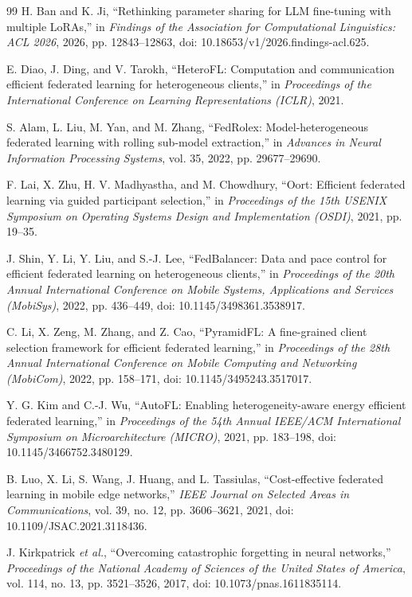 \documentclass[10pt,conference,letterpaper]{IEEEtran}
\begin{document}
\begin{thebibliography}{99}
H. Ban and K. Ji,
``Rethinking parameter sharing for LLM fine-tuning with multiple LoRAs,''
in \emph{Findings of the Association for Computational Linguistics: ACL 2026}, 2026, pp. 12843--12863,
doi: 10.18653/v1/2026.findings-acl.625.

E. Diao, J. Ding, and V. Tarokh,
``HeteroFL: Computation and communication efficient federated learning for heterogeneous clients,''
in \emph{Proceedings of the International Conference on Learning Representations (ICLR)}, 2021.

S. Alam, L. Liu, M. Yan, and M. Zhang,
``FedRolex: Model-heterogeneous federated learning with rolling sub-model extraction,''
in \emph{Advances in Neural Information Processing Systems}, vol. 35, 2022, pp. 29677--29690.

F. Lai, X. Zhu, H. V. Madhyastha, and M. Chowdhury,
``Oort: Efficient federated learning via guided participant selection,''
in \emph{Proceedings of the 15th USENIX Symposium on Operating Systems Design and Implementation (OSDI)}, 2021, pp. 19--35.

J. Shin, Y. Li, Y. Liu, and S.-J. Lee,
``FedBalancer: Data and pace control for efficient federated learning on heterogeneous clients,''
in \emph{Proceedings of the 20th Annual International Conference on Mobile Systems, Applications and Services (MobiSys)}, 2022, pp. 436--449,
doi: 10.1145/3498361.3538917.

C. Li, X. Zeng, M. Zhang, and Z. Cao,
``PyramidFL: A fine-grained client selection framework for efficient federated learning,''
in \emph{Proceedings of the 28th Annual International Conference on Mobile Computing and Networking (MobiCom)}, 2022, pp. 158--171,
doi: 10.1145/3495243.3517017.

Y. G. Kim and C.-J. Wu,
``AutoFL: Enabling heterogeneity-aware energy efficient federated learning,''
in \emph{Proceedings of the 54th Annual IEEE/ACM International Symposium on Microarchitecture (MICRO)}, 2021, pp. 183--198,
doi: 10.1145/3466752.3480129.

B. Luo, X. Li, S. Wang, J. Huang, and L. Tassiulas,
``Cost-effective federated learning in mobile edge networks,''
\emph{IEEE Journal on Selected Areas in Communications}, vol. 39, no. 12, pp. 3606--3621, 2021,
doi: 10.1109/JSAC.2021.3118436.

J. Kirkpatrick \emph{et al.},
``Overcoming catastrophic forgetting in neural networks,''
\emph{Proceedings of the National Academy of Sciences of the United States of America}, vol. 114, no. 13, pp. 3521--3526, 2017,
doi: 10.1073/pnas.1611835114.


\end{thebibliography}
\end{document}
